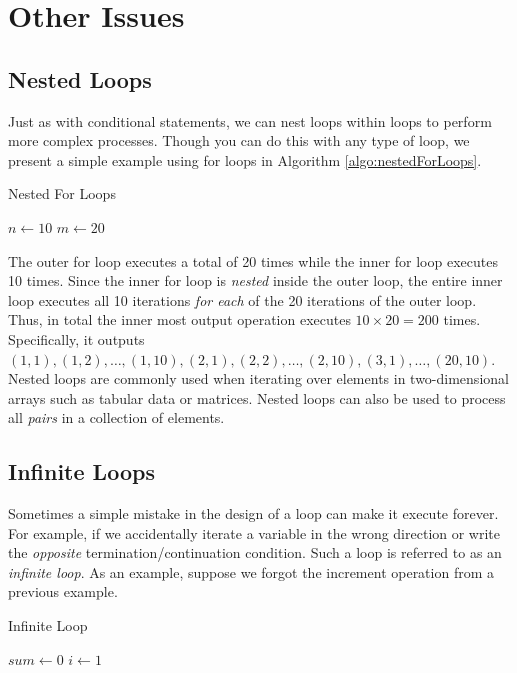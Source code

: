 \section{Other Issues}

\subsection{Nested Loops}

Just as with conditional statements, we can nest loops within loops to perform
more complex processes.  Though you can do this with any type of loop, we 
present a simple example using for loops in Algorithm \ref{algo:nestedForLoops}.

\begin{algorithm}[h]
\caption{Nested For Loops}
\label{algo:nestedForLoops}
$n \leftarrow 10$ \;
$m \leftarrow 20$ \;
\end{algorithm}

The outer for loop executes a total of 20 times while the inner for loop 
executes 10 times.  Since the inner for loop is \emph{nested} inside the 
outer loop, the entire inner loop executes all 10 iterations \emph{for each}
of the 20 iterations of the outer loop.  Thus, in total the inner most output
operation executes $10 \times 20 = 200$ times.  Specifically, it outputs 
$(1, 1), (1, 2), \ldots, (1, 10), (2, 1), (2, 2), \ldots, (2, 10), (3, 1), \ldots, (20, 10)$.  Nested loops are commonly used when iterating over elements 
in two-dimensional 
arrays such as tabular data or matrices.  Nested loops can also be used 
to process all \emph{pairs} in a collection of elements.

\subsection{Infinite Loops}
\label{subsection:infiniteLoops}

Sometimes a simple mistake in the design of a loop can make it execute forever.  
For example, if we accidentally iterate a variable in the wrong direction or write the
\emph{opposite} termination/continuation condition.  Such a loop is referred to as 
an \emph{infinite loop}.  As an example, suppose we forgot the increment operation
from a previous example.

\begin{algorithm}[h]
\caption{Infinite Loop}
\label{algo:infiniteLoop}
$sum \leftarrow 0$ \;
$i \leftarrow 1$ \;
\end{algorithm}


